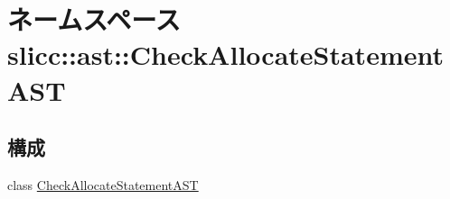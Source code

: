 \hypertarget{namespaceslicc_1_1ast_1_1CheckAllocateStatementAST}{
\section{ネームスペース slicc::ast::CheckAllocateStatementAST}
\label{namespaceslicc_1_1ast_1_1CheckAllocateStatementAST}
}
\subsection*{構成}
\begin{DoxyCompactItemize}
\item 
class \hyperlink{classslicc_1_1ast_1_1CheckAllocateStatementAST_1_1CheckAllocateStatementAST}{CheckAllocateStatementAST}
\end{DoxyCompactItemize}
